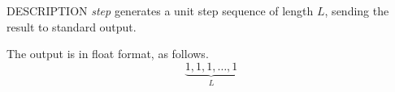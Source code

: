 % 
% 
% 
% 
%                                                                        
%

\begin{synopsis}
\item[step] [ --l $L$ ] [ --n $N$ ]
\end{synopsis}

\begin{qsection}{DESCRIPTION}
{\em step} generates a unit step sequence of length $L$, 
sending the result to standard output.

The output is in float format, as follows.
\begin{displaymath}
\underbrace{1, 1, 1, \dots, 1}_{L}
\end{displaymath}
\end{qsection}

